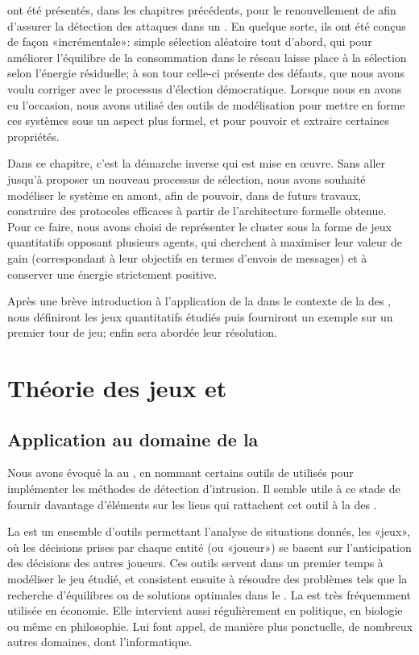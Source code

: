 \vfill
{} ont été présentés, dans les chapitres précédents, pour le renouvellement de \cns afin d'assurer la détection des attaques dans un \rcsfs.
En quelque sorte, ils ont été conçus de façon «incrémentale»: simple sélection aléatoire tout d'abord, qui pour améliorer l'équilibre de la consommation dans le réseau laisse place à la sélection selon l'énergie résiduelle; à son tour celle-ci présente des défauts, que nous avons voulu corriger avec le processus d'élection démocratique.
Lorsque nous en avons eu l'occasion, nous avons utilisé des outils de modélisation pour mettre en forme ces systèmes sous un aspect plus formel, et pour pouvoir et extraire certaines propriétés.

Dans ce chapitre, c'est la démarche inverse qui est mise en œuvre.
Sans aller jusqu'à proposer un nouveau processus de sélection, nous avons souhaité modéliser le système en amont, afin de pouvoir, dans de futurs travaux, construire des protocoles efficaces à partir de l'architecture formelle obtenue.
Pour ce faire, nous avons choisi de représenter le cluster sous la forme de jeux quantitatifs opposant plusieurs agents, qui cherchent à maximiser leur valeur de gain (correspondant à leur objectifs en termes d'envois de messages) et à conserver une énergie strictement positive.

Après une brève introduction à l'application de la  dans le contexte de la \secu des \rcs, nous définiront les jeux quantitatifs étudiés puis fourniront un exemple sur un premier tour de jeu; enfin sera abordée leur résolution.
\pagebreak %

\section{Théorie des jeux et \rcs}

    \subsection{Application au domaine de la \secu}
Nous avons évoqué la  au , en nommant certains outils de  utilisés pour implémenter les méthodes de détection d'intrusion.
Il semble utile à ce stade de fournir davantage d'éléments sur les liens qui rattachent cet outil à la \secu des \rcsfs.

La  est un ensemble d'outils permettant l'analyse de situations donnés, les «jeux», où les décisions prises par chaque entité (ou «joueur») se basent sur l'anticipation des décisions des autres joueurs.
Ces outils servent dans un premier temps à modéliser le jeu étudié, et consistent ensuite à résoudre des problèmes tels que la recherche d'équilibres ou de solutions optimales dans le .
La  est très fréquemment utilisée en économie.
Elle intervient aussi régulièrement en politique, en biologie ou même en philosophie.
Lui font appel, de manière plus ponctuelle, de nombreux autres domaines, dont l'informatique.

